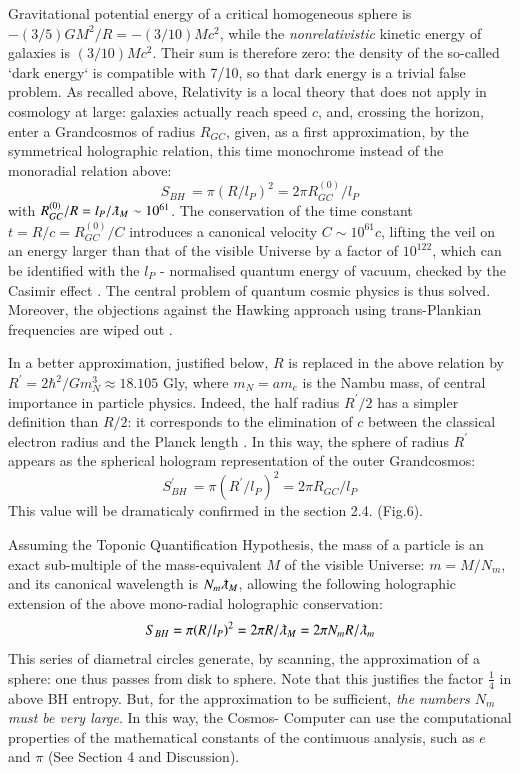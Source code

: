 \documentclass[twoside,draft]{article}
\begin{document}
\begin{sloppypar}
{Gravitational potential energy of a critical homogeneous sphere is $-(3/5)GM^{2}/R = -
(3/10)Mc^{2}$, while the \textit{nonrelativistic} kinetic energy of galaxies is $(3/10)Mc^{2}$. Their sum is therefore zero: the density of the so-called `dark energy` is compatible with 7/10, so that dark energy is a
trivial false problem. As recalled above, Relativity is a local theory that does not apply in
cosmology at large: galaxies actually reach speed $c$, and, crossing the horizon, enter a Grandcosmos of
radius $R_{GC}$, given, as a first approximation, by the symmetrical holographic relation, this time
monochrome instead of the monoradial relation above:
\begin{equation}
S_{BH}\, = \pi(R/l_P )^{2} = 2\pi R^{(0)}_{GC} /l_{P}
\end{equation}
with $R^{(0)}_{GC} /R = l_{P} /\lambdabar_{M} \sim 10^{61}$. The conservation of the time constant $t = R/c = R^{(0)}_{GC} /C$ introduces a canonical velocity $C \sim 10^{61} c$, lifting the veil on an energy larger than that of the visible Universe by a factor of $10^{122}$, which can be identified with the $l_{P}$ - normalised quantum energy of vacuum, checked by
the Casimir effect \cite{Duplantier}. The central problem of quantum cosmic physics is thus solved. Moreover, the
objections against the Hawking approach using trans-Plankian frequencies are wiped out \cite{Damour}.

In a better approximation, justified below, $R$ is replaced in the above relation by $R^{\prime} = 2\hbar^{2}/Gm_{N}^{3}
\approx 18.105$ Gly, where $m_{N} = am_{e}$ is the Nambu mass, of central importance in particle
physics. Indeed, the half radius $R^{\prime}/2$ has a simpler definition than $R/2$: it corresponds to the
elimination of $c$ between the classical electron radius and the Planck length \cite{Sanchez1}. In this way, the sphere
of radius $R^{\prime}$ appears as the spherical hologram representation of the outer Grandcosmos:
\begin{equation}
S^{\prime}_{BH}\, = \pi(R^{\prime}/l_{P})^{2} = 2\pi R_{GC} /l_{P}
\end{equation}
This value will be dramaticaly confirmed in the section 2.4. (Fig.6).

Assuming the Toponic Quantification Hypothesis, the mass of a particle is an exact sub-multiple
of the mass-equivalent $M$ of the visible Universe: $m = M/N_{m}$, and its canonical wavelength is $N_m \lambdabar_{M}$,
allowing the following holographic extension of the above mono-radial holographic conservation:
\begin{equation}
S_{BH} = \pi(R/l_{P})^{2} = 2\pi R/\lambdabar_{M} = 2\pi N_{m} R/\lambdabar_{m}
\end{equation}
This series of diametral circles generate, by scanning, the approximation of a sphere: one thus passes
from disk to sphere. Note that this justifies the factor $\frac{1}{4}$ in above BH entropy. But, for
the approximation to be sufficient, \textit{the numbers $N_{m}$ must be very large}. In this way, the Cosmos-
Computer can use the computational properties of the mathematical constants of the continuous
analysis, such as $e$ and $\pi$ (See Section 4 and Discussion).

}
\end{sloppypar}
\end{document}
